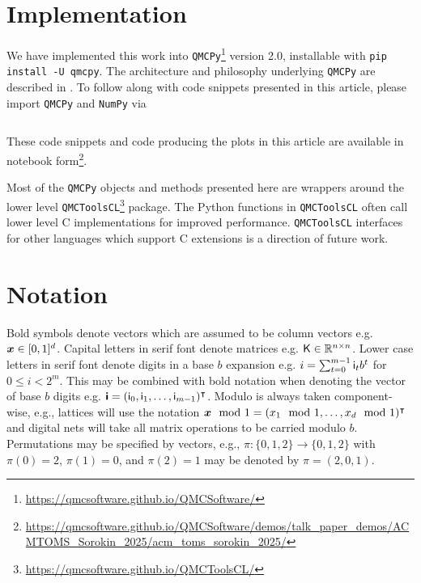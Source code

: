 \documentclass[acmsmall]{acmart}
\begin{document}
\section{Implementation} \label{sec:implementation}

We have implemented this work into \texttt{QMCPy}\footnote{\url{https://qmcsoftware.github.io/QMCSoftware/}} version 2.0, installable with \texttt{pip install -U qmcpy}. The architecture and philosophy underlying \texttt{QMCPy} are described in \citep{choi.QMC_software,choi.challenges_great_qmc_software}. To follow along with code snippets presented in this article, please import \texttt{QMCPy} and \texttt{NumPy} via

\begin{listing}[H]
    \inputminted{python}{snippets/imports.txt}
    \caption{Import the Python packages to be used in examples throughout this paper.}
    \label{code:imports}
\end{listing}

\noindent These code snippets and code producing the plots in this article are available in notebook form\footnote{\url{https://qmcsoftware.github.io/QMCSoftware/demos/talk_paper_demos/ACMTOMS_Sorokin_2025/acm_toms_sorokin_2025/}}.

Most of the \texttt{QMCPy} objects and methods presented here are wrappers around the lower level \texttt{QMCToolsCL}\footnote{\url{https://qmcsoftware.github.io/QMCToolsCL/}} package. The Python functions in \texttt{QMCToolsCL} often call lower level C implementations for improved performance. \texttt{QMCToolsCL} interfaces for other languages which support C extensions is a direction of future work.

\section{Notation} \label{sec:notation}

Bold symbols denote vectors which are assumed to be column vectors e.g. ${\boldsymbol{x}} \in [0,1]^d$. Capital letters in serif font denote matrices e.g. ${\mathsf{K}} \in {\mathbb{R}}^{n \times n}$. Lower case letters in serif font denote digits in a base $b$ expansion e.g. $i = \sum_{t=0}^{m-1} {\mathsf{i}}_t b^t$ for $0 \leq i < 2^m$. This may be combined with bold notation when denoting the vector of base $b$ digits e.g. ${\boldsymbol{\mathsf{i}}} = ({\mathsf{i}}_0,{\mathsf{i}}_1,\dots,{\mathsf{i}}_{m-1})^\intercal$. Modulo is always taken component-wise, e.g., lattices will use the notation ${\boldsymbol{x}} \mod 1 = (x_1 \mod 1,\dots,x_d \mod 1)^\intercal$ and digital nets will take all matrix operations to be carried modulo $b$. Permutations may be specified by vectors, e.g., $\pi: \{0,1,2\} \to \{0,1,2\}$ with $\pi(0) = 2$, $\pi(1) = 0$, and $\pi(2)=1$ may be denoted by $\pi = (2,0,1)$. 
\end{document}
